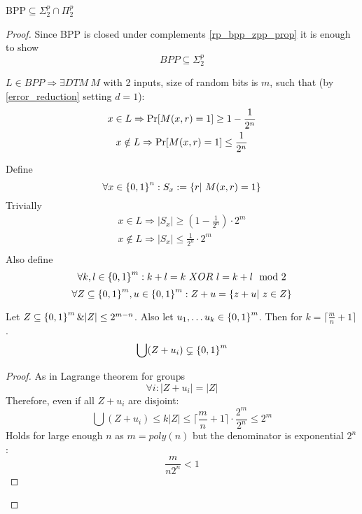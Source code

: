 \begin{theorem}
	BPP$\subseteq \Sigma^p_2 \cap \Pi_2^p$
\end{theorem}
\begin{proof}
	Since BPP is closed under complements \cref{rp_bpp_zpp_prop} it is enough to show
	\[ BPP \subseteq \Sigma^p_2 \]

	$L \in BPP \Rightarrow \exists DTM\ M$ with 2 inputs, size of random bits is $m$, such that (by \cref{error_reduction} setting $d = 1$):
    	\begin{gather*}
		x \in L \Rightarrow \operatorname{Pr}[M(x, r) = 1] \geq 1 - \frac{1}{2^n} \\
		x \notin L \Rightarrow \operatorname{Pr}[M(x, r) = 1] \leq \frac{1}{2^n}
    	\end{gather*}

	Define
	\[ \forall x \in \operatorname{\{ 0, 1 \}}^n: S_x := \{ r |\ M(x, r) = 1 \} \]
	Trivially
    	\begin{gather*}
		x \in L \Rightarrow |S_x| \geq (1 - \frac{1}{2^n}) \cdot 2^m \\
		x \notin L \Rightarrow |S_x| \leq \frac{1}{2^n} \cdot 2^m \\
    	\end{gather*}
	Also define
	\[ \forall k, l \in \operatorname{\{ 0, 1 \}}^m: k + l = k\ XOR\ l = k + l \mod2 \]
	\[ \forall Z \subseteq \operatorname{\{ 0, 1 \}}^m, u \in \operatorname{\{ 0, 1 \}}^m: Z + u = \{ z + u |\ z \in Z \} \]

	\begin{lemma}
		Let $Z \subseteq \operatorname{\{ 0, 1 \}}^m \& |Z| \leq 2^{m - n}$.
		Also let $u_1, \ldots u_k \in \operatorname{\{ 0, 1 \}}^m$.
		Then for $k = \lceil \frac{m}{n} + 1 \rceil$.
		\[ \bigcup (Z + u_i) \subsetneq \operatorname{\{ 0, 1 \}}^m \]
	\end{lemma}
	\begin{proof}
		As in Lagrange theorem for groups
		\[ \forall i: |Z + u_i| = |Z| \]
		Therefore, even if all $Z + u_i$ are disjoint:
		\[ \bigcup (Z + u_i) \leq k |Z| \leq \lceil \frac{m}{n} + 1 \rceil \cdot \frac{2^m}{2^n} \leq 2^m \]
		Holds for large enough $n$ as $m = poly(n)$ but the denominator is exponential $2^n$:
		\[ \frac{m}{n 2^n} < 1 \]
	\end{proof}


\end{proof}
